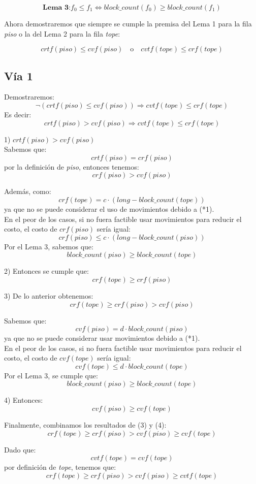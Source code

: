 \documentclass[a4paper,12pt]{article}
\begin{document}
\[
\textbf{Lema 3:} f_0 \leq f_1 \iff \textit{block\_count}(f_0) \geq \textit{block\_count}(f_1)
\]

Ahora demostraremos que siempre se cumple la premisa del Lema 1 para la fila \textit{piso} o la del Lema 2 para la fila \textit{tope}:

\[
crtf(piso) \leq cvf(piso) \quad \text{o} \quad cvtf(tope) \leq crf(tope)
\]

\subsection{Vía 1}
Demostraremos:
\[
\neg \left( crtf(piso) \leq cvf(piso) \right) \Rightarrow cvtf(tope) \leq crf(tope)
\]
Es decir:
\[
crtf(piso) > cvf(piso) \Rightarrow cvtf(tope) \leq crf(tope)
\]

1) $crtf(piso) > cvf(piso)$\\
Sabemos que:
\[
crtf(piso) = crf(piso)
\]
por la definición de \textit{piso}, entonces tenemos:
\[
crf(piso) > cvf(piso)
\]

Además, como:
\[
crf(tope) = c \cdot (long - \textit{block\_count}(tope))
\]
ya que no se puede considerar el uso de movimientos debido a (*1).\\
En el peor de los casos, si no fuera factible usar movimientos para reducir el costo, el costo de $crf(piso)$ sería igual:
\[
crf(piso) \leq c \cdot (long - \textit{block\_count}(piso))
\]
Por el Lema 3, sabemos que:
\[
\textit{block\_count}(piso) \geq \textit{block\_count}(tope)
\]

2) Entonces se cumple que:
\[
crf(tope) \geq crf(piso)
\]

3) De lo anterior obtenemos:
\[
crf(tope) \geq crf(piso) > cvf(piso)
\]

Sabemos que:
\[
cvf(piso) = d \cdot \textit{block\_count}(piso)
\]
ya que no se puede considerar usar movimientos debido a (*1).\\
En el peor de los casos, si no fuera factible usar movimientos para reducir el costo, el costo de $cvf(tope)$ sería igual:
\[
cvf(tope) \leq d \cdot \textit{block\_count}(tope)
\]
Por el Lema 3, se cumple que:
\[
\textit{block\_count}(piso) \geq \textit{block\_count}(tope)
\]

4) Entonces:
\[
cvf(piso) \geq cvf(tope)
\]

Finalmente, combinamos los resultados de (3) y (4):
\[
crf(tope) \geq crf(piso) > cvf(piso) \geq cvf(tope)
\]

Dado que:
\[
cvtf(tope) = cvf(tope)
\]
por definición de \textit{tope}, tenemos que:
\[
crf(tope) \geq crf(piso) > cvf(piso) \geq cvtf(tope)
\]
\end{document}
